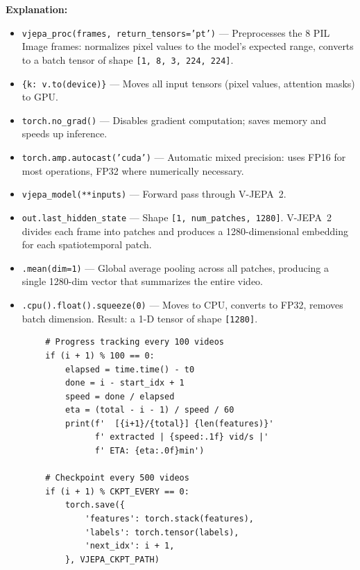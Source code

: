 \documentclass[a4paper, 12pt]{article}
\newenvironment{explanation}{%
  \par\smallskip
  \noindent\textcolor{blue!70!black}{\textbf{Explanation:}}\\
  \noindent
}{\par\medskip}
\begin{document}
\begin{explanation}
\begin{itemize}[nosep]
  \item \texttt{vjepa\_proc(frames, return\_tensors='pt')} --- Preprocesses the 8 PIL Image frames: normalizes pixel values to the model's expected range, converts to a batch tensor of shape \texttt{[1, 8, 3, 224, 224]}.
  \item \texttt{\{k: v.to(device)\}} --- Moves all input tensors (pixel values, attention masks) to GPU.
  \item \texttt{torch.no\_grad()} --- Disables gradient computation; saves memory and speeds up inference.
  \item \texttt{torch.amp.autocast('cuda')} --- Automatic mixed precision: uses FP16 for most operations, FP32 where numerically necessary.
  \item \texttt{vjepa\_model(**inputs)} --- Forward pass through V-JEPA~2.
  \item \texttt{out.last\_hidden\_state} --- Shape \texttt{[1, num\_patches, 1280]}. V-JEPA~2 divides each frame into patches and produces a 1280-dimensional embedding for each spatiotemporal patch.
  \item \texttt{.mean(dim=1)} --- Global average pooling across all patches, producing a single 1280-dim vector that summarizes the entire video.
  \item \texttt{.cpu().float().squeeze(0)} --- Moves to CPU, converts to FP32, removes batch dimension. Result: a 1-D tensor of shape \texttt{[1280]}.
\end{itemize}
\end{explanation}

\begin{lstlisting}
        # Progress tracking every 100 videos
        if (i + 1) % 100 == 0:
            elapsed = time.time() - t0
            done = i - start_idx + 1
            speed = done / elapsed
            eta = (total - i - 1) / speed / 60
            print(f'  [{i+1}/{total}] {len(features)}'
                  f' extracted | {speed:.1f} vid/s |'
                  f' ETA: {eta:.0f}min')

        # Checkpoint every 500 videos
        if (i + 1) % CKPT_EVERY == 0:
            torch.save({
                'features': torch.stack(features),
                'labels': torch.tensor(labels),
                'next_idx': i + 1,
            }, VJEPA_CKPT_PATH)
\end{lstlisting}
\end{document}
